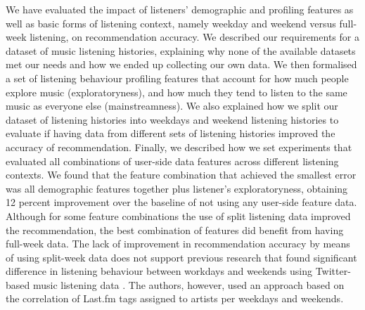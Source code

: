 We have evaluated the impact of listeners' demographic and profiling features as well as basic forms of listening context, namely weekday and weekend versus full-week listening, on recommendation accuracy.
We described our requirements for a dataset of music listening histories, explaining why none of the  available datasets met our needs and how we ended up collecting our own data. 
We then formalised a set of listening behaviour profiling features that account for how much people explore music (exploratoryness), and how much they tend to listen to the same music as everyone else (mainstreamness). We also explained how we split our dataset of listening histories into weekdays  and weekend listening histories to evaluate if having data from different sets of listening histories improved the accuracy of recommendation.
Finally, we described how we set experiments that evaluated all combinations of user-side data features across different listening contexts. We found that the feature combination that achieved the smallest error was all demographic features together plus  listener's exploratoryness, obtaining 12 percent improvement over the baseline of not using any user-side feature data. 
Although for some feature combinations the use of split listening data improved the recommendation, the best combination of features did benefit from having full-week data. 
The lack of improvement in recommendation accuracy by means of using split-week data does not support previous research that found significant difference in listening behaviour between workdays and weekends using Twitter-based music listening data \autocite{schedl13leveraging}. The authors, however, used an approach based on the correlation of Last.fm tags assigned to artists per weekdays and weekends.

